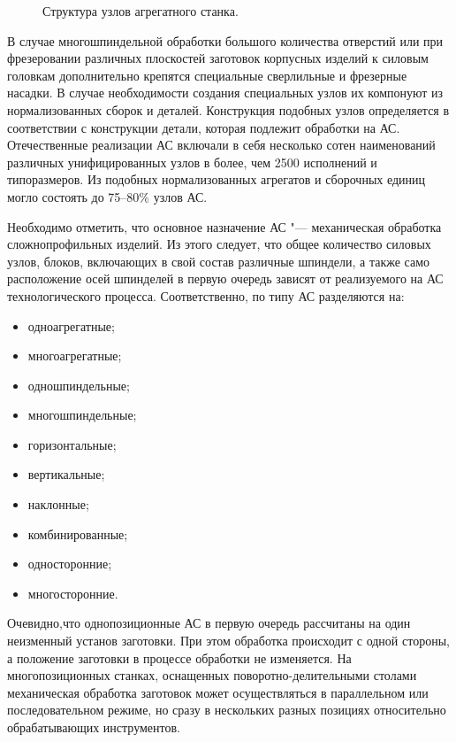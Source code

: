 \begin{figure}[ht]
	\caption{Структура узлов агрегатного станка.}\label{fig:agr-machine}
\end{figure}

В случае многошпиндельной обработки большого количества отверстий или при фрезеровании различных плоскостей заготовок корпусных изделий к силовым головкам дополнительно крепятся специальные сверлильные и фрезерные насадки. В случае необходимости создания специальных узлов их компонуют из нормализованных сборок и деталей. Конструкция подобных узлов определяется в соответствии с конструкции детали, которая подлежит обработки на АС. Отечественные реализации АС включали в себя несколько сотен наименований различных унифицированных узлов в более, чем 2500 исполнений и типоразмеров. Из подобных нормализованных агрегатов и сборочных единиц могло состоять до 75--80\% узлов АС.

Необходимо отметить, что основное назначение АС "--- механическая обработка сложнопрофильных изделий. Из этого следует, что общее количество силовых узлов, блоков, включающих в свой состав различные шпиндели, а также само расположение осей шпинделей в первую очередь зависят от реализуемого на АС технологического процесса. Соответственно, по типу АС разделяются на: 

\begin{itemize}
	\item одноагрегатные;
	\item многоагрегатные;
	\item одношпиндельные;
	\item многошпиндельные;
	\item горизонтальные;
	\item вертикальные;
	\item наклонные;
	\item комбинированные;
	\item односторонние;
	\item многосторонние.
\end{itemize}

Очевидно,что однопозиционные АС в первую очередь рассчитаны на один неизменный установ заготовки. При этом обработка происходит с одной стороны, а положение заготовки в процессе обработки не изменяется. На многопозиционных станках, оснащенных поворотно-делительными столами механическая обработка заготовок может осуществляться в параллельном или последовательном режиме, но сразу в нескольких разных позициях относительно обрабатывающих инструментов.

